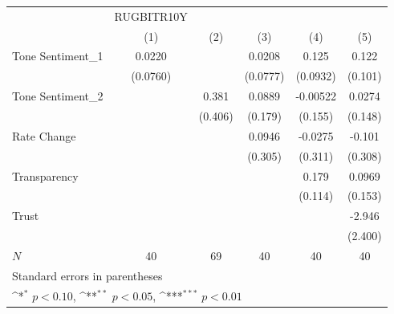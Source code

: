 {
\def\sym#1{\ifmmode^{#1}\else\(^{#1}\)\fi}
\begin{tabular}{l*{5}{c}}
\hline\hline
            &  RUGBITR10Y         &                     &                     &                     &                     \\
            &\multicolumn{1}{c}{(1)}         &\multicolumn{1}{c}{(2)}         &\multicolumn{1}{c}{(3)}         &\multicolumn{1}{c}{(4)}         &\multicolumn{1}{c}{(5)}         \\
\hline
Tone Sentiment\_{1}&      0.0220         &                     &      0.0208         &       0.125         &       0.122         \\
            &    (0.0760)         &                     &    (0.0777)         &    (0.0932)         &     (0.101)         \\
[1em]
Tone Sentiment\_{2}&                     &       0.381         &      0.0889         &    -0.00522         &      0.0274         \\
            &                     &     (0.406)         &     (0.179)         &     (0.155)         &     (0.148)         \\
[1em]
Rate Change &                     &                     &      0.0946         &     -0.0275         &      -0.101         \\
            &                     &                     &     (0.305)         &     (0.311)         &     (0.308)         \\
[1em]
Transparency&                     &                     &                     &       0.179         &      0.0969         \\
            &                     &                     &                     &     (0.114)         &     (0.153)         \\
[1em]
Trust       &                     &                     &                     &                     &      -2.946         \\
            &                     &                     &                     &                     &     (2.400)         \\
\hline
\(N\)       &          40         &          69         &          40         &          40         &          40         \\
\hline\hline
\multicolumn{6}{l}{\footnotesize Standard errors in parentheses}\\
\multicolumn{6}{l}{\footnotesize \sym{*} \(p<0.10\), \sym{**} \(p<0.05\), \sym{***} \(p<0.01\)}\\
\end{tabular}
}
